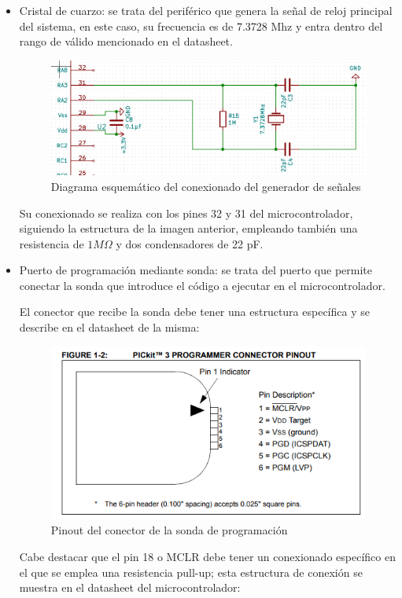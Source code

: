 \begin{itemize}
    \item Cristal de cuarzo: se trata del periférico que genera la señal de reloj principal del sistema, en este caso, su frecuencia es de 7.3728 Mhz y entra dentro del rango de válido mencionado en el datasheet.
    
    \begin{figure}[H]
    \centering 
    \includegraphics[width=.7\linewidth]{pictures/Cristal.PNG}
    \caption{Diagrama esquemático del conexionado del generador de señales}
    \label{fig:kdiagram}
    \end{figure}
    
    Su conexionado se realiza con los pines 32 y 31 del microcontrolador, siguiendo la estructura de la imagen anterior, empleando también una resistencia de $1 M \Omega$ y dos condensadores de 22 pF.
    
    \item Puerto de programación mediante sonda: se trata del puerto que permite conectar la sonda que introduce el código a ejecutar en el microcontrolador.
    
    El conector que recibe la sonda debe tener una estructura específica y se describe en el datasheet de la misma:
    
    \begin{figure}[H]
    \centering 
    \includegraphics[width=.5\linewidth]{pictures/Sonda.PNG}
    \caption{Pinout del conector de la sonda de programación}
    \label{fig:kdiagram}
    \end{figure}
    
     Cabe destacar que el pin 18 o MCLR debe tener un conexionado específico en el que se emplea una resistencia pull-up; esta estructura de conexión se muestra en el datasheet del microcontrolador:
     

\end{itemize}
